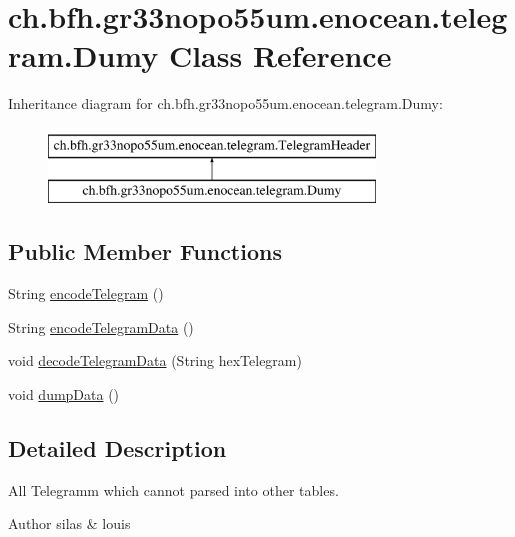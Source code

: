 \hypertarget{classch_1_1bfh_1_1gr33nopo55um_1_1enocean_1_1telegram_1_1_dumy}{}\section{ch.\+bfh.\+gr33nopo55um.\+enocean.\+telegram.\+Dumy Class Reference}
\label{classch_1_1bfh_1_1gr33nopo55um_1_1enocean_1_1telegram_1_1_dumy}
Inheritance diagram for ch.\+bfh.\+gr33nopo55um.\+enocean.\+telegram.\+Dumy\+:\begin{figure}[H]
\begin{center}
\leavevmode
\includegraphics[height=2.000000cm]{classch_1_1bfh_1_1gr33nopo55um_1_1enocean_1_1telegram_1_1_dumy}
\end{center}
\end{figure}
\subsection*{Public Member Functions}
\begin{DoxyCompactItemize}
\item 
String \hyperlink{classch_1_1bfh_1_1gr33nopo55um_1_1enocean_1_1telegram_1_1_dumy_a5871cf24d339f06a2ec631b53c66a876}{encode\+Telegram} ()
\item 
String \hyperlink{classch_1_1bfh_1_1gr33nopo55um_1_1enocean_1_1telegram_1_1_dumy_a1fb8aa19a984b3bef0704aa830c9ee64}{encode\+Telegram\+Data} ()
\item 
void \hyperlink{classch_1_1bfh_1_1gr33nopo55um_1_1enocean_1_1telegram_1_1_dumy_a7317143b3a513cd3669574f3a025e428}{decode\+Telegram\+Data} (String hex\+Telegram)
\item 
void \hyperlink{classch_1_1bfh_1_1gr33nopo55um_1_1enocean_1_1telegram_1_1_dumy_ad1d8a64998f0642b7e63d0f282e91fc7}{dump\+Data} ()
\end{DoxyCompactItemize}


\subsection{Detailed Description}
All Telegramm which cannot parsed into other tables.

\begin{DoxyAuthor}{Author}
silas \& louis 
\end{DoxyAuthor}


